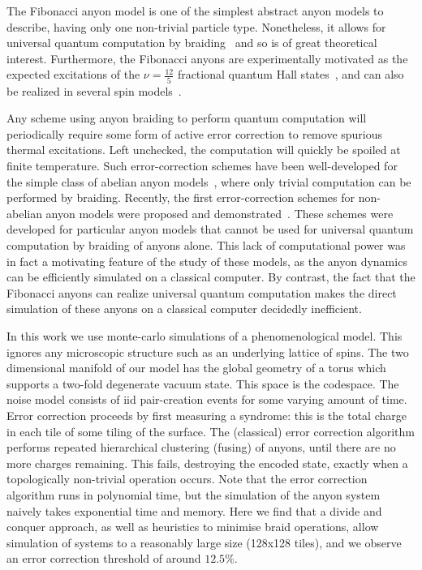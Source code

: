 \documentclass[12pt,notitlepage,aps,pra,longbibliography,nofootinbib,tightenlines,superscriptaddress]{revtex4}
\begin{document}
The Fibonacci anyon model is one of the simplest abstract anyon models  
to describe, having only one non-trivial particle type. Nonetheless,  
it allows for universal quantum computation by braiding~\cite{Freedman2002} and so  
is of great theoretical interest. Furthermore, the Fibonacci anyons  
are experimentally motivated as the expected excitations of the  
$\nu=\frac{12}{5}$ fractional quantum Hall states~\cite{Slingerland2001}, and can  
also be realized in several spin models~\cite{Levin2005, Palumbo2013, Kapit2013}.


Any scheme using anyon braiding to perform quantum computation will  
periodically require some form of active error correction to remove  
spurious thermal excitations. Left unchecked, the computation will  
quickly be spoiled at finite temperature. Such error-correction  
schemes have been well-developed for the simple class of abelian anyon  
models~\cite{Dennis2002,Duclos-Cianci2010a,Bravyi2011}, where only trivial computation can be performed by  
braiding.
Recently, the first error-correction schemes for non-abelian  
anyon models were proposed and demonstrated~\cite{Wootton2013, Brell2013}.
These schemes  
were developed for particular anyon models that cannot be used for  
universal quantum computation by braiding of anyons alone. This lack  
of computational power was in fact a motivating feature of the study  
of these models, as the anyon dynamics can be efficiently simulated on  
a classical computer.
By contrast, the fact that the Fibonacci anyons  
can realize universal quantum computation makes the direct  
simulation of these anyons on a classical computer decidedly  
inefficient.

In this work we use monte-carlo simulations of a 
phenomenological model.
This ignores any microscopic structure such as
an underlying lattice of spins.
The two dimensional manifold of our model has the global 
geometry of a torus which supports a two-fold degenerate
vacuum state.
This space is the codespace.
The noise model consists of iid pair-creation
events for some varying amount of time.
Error correction proceeds by first measuring
a syndrome: this is the total charge in each
tile of some tiling of the surface.
The (classical) error correction algorithm
performs repeated hierarchical clustering (fusing) of anyons,
until there are no more charges remaining.
This fails, destroying the encoded state,
exactly when a topologically non-trivial operation occurs.
Note that the error correction algorithm runs in polynomial time,
but the simulation of the anyon system naively takes exponential
time and memory.
Here we find that a divide and conquer approach,
as well as heuristics to minimise braid operations, allow
simulation of systems to a reasonably large size (128x128 tiles),
and we observe an error correction threshold of around $12.5\%$.
\end{document}
